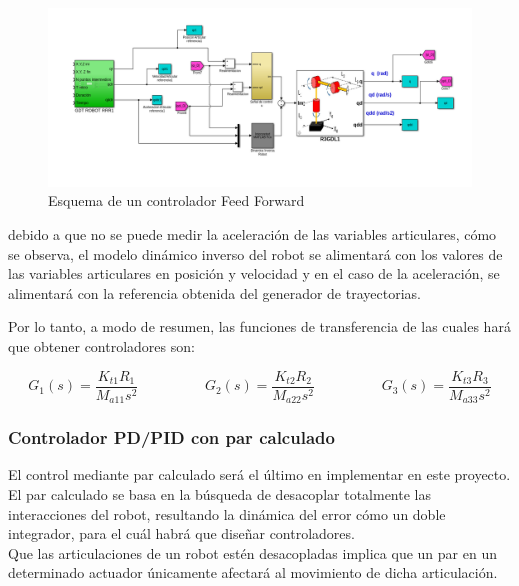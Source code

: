 \begin{figure}[h!]
	
	\centering
	
	\includegraphics[width=.8\textwidth]{montaje_feedforward}
	
	\caption{Esquema de un controlador Feed Forward}
	
\end{figure}



debido a que no se puede medir la aceleración de las variables articulares, cómo se observa, el modelo dinámico inverso del robot se alimentará con los valores de las variables articulares en posición y velocidad y en el caso de la aceleración, se alimentará con la referencia obtenida del generador de trayectorias.



Por lo tanto, a modo de resumen, las funciones de transferencia de las cuales hará que obtener controladores son:

\begin{equation}
G_{1}(s)=\frac{K_{t1}R_1}{M_{a11}s^{2}} \hspace{2cm} G_{2}(s)=\frac{K_{t2}R_2}{M_{a22}s^{2}} \hspace{2cm} G_{3}(s)=\frac{K_{t3}R_3}{M_{a33}s^{2}}
\end{equation}





\subsubsection{Controlador PD/PID con par calculado}

El control mediante par calculado será el último en implementar en este proyecto. El par calculado se basa en la búsqueda de desacoplar totalmente las interacciones del robot, resultando la dinámica del error cómo un doble integrador, para el cuál habrá que diseñar controladores. \\

Que las articulaciones de un robot estén desacopladas implica que un par en un determinado actuador únicamente afectará al movimiento de dicha articulación.\\

